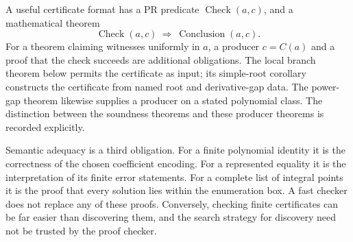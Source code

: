 A useful certificate format has a PR predicate
\(\operatorname{Check}(a,c)\), and a mathematical theorem
\[
 \operatorname{Check}(a,c)\ \Longrightarrow\ \operatorname{Conclusion}(a,c).
\]
For a theorem claiming witnesses uniformly in \(a\), a producer
\(c=C(a)\) and a proof that the check succeeds are additional obligations.
The local branch theorem below permits the certificate as input; its
simple-root corollary constructs the certificate from named root and
derivative-gap data.  The power-gap theorem likewise supplies a producer
on a stated polynomial class.  The distinction between the soundness
theorems and these producer theorems is recorded explicitly.

Semantic adequacy is a third obligation.  For a finite polynomial identity
it is the correctness of the chosen coefficient encoding.  For a
represented equality it is the interpretation of its finite error
statements.  For a complete list of integral points it is the proof that
every solution lies within the enumeration box.  A fast checker does not
replace any of these proofs.  Conversely, checking finite certificates can
be far easier than discovering them, and the search strategy for discovery
need not be trusted by the proof checker.
